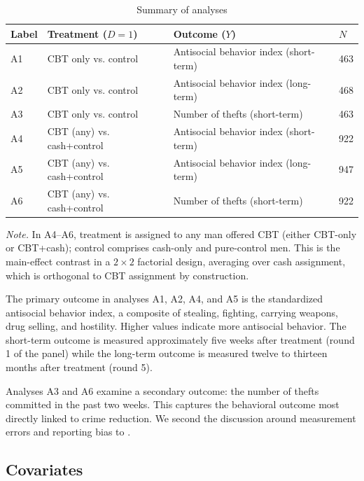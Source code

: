 \documentclass[11pt]{article}
\begin{document}
\begin{table}[H]
\centering
\caption{Summary of analyses}
\label{tab:analyses}
\begin{tabular}{llll}
\toprule
Label & Treatment ($D=1$) & Outcome ($Y$) & $N$ \\
\midrule
A1 & CBT only vs. control & Antisocial behavior index (short-term) & 463 \\
A2 & CBT only vs. control & Antisocial behavior index (long-term)  & 468 \\
A3 & CBT only vs. control & Number of thefts (short-term)           & 463 \\
\midrule
A4 & CBT (any) vs. cash+control & Antisocial behavior index (short-term) &  922 \\
A5 & CBT (any) vs. cash+control & Antisocial behavior index (long-term)  & 947 \\
A6 & CBT (any) vs. cash+control & Number of thefts (short-term)           & 922 \\
\bottomrule
\end{tabular}
\begin{minipage}
{\textwidth}
\footnotesize \noindent\textit{Note.} In A4--A6, treatment is assigned to any man offered CBT (either CBT-only or CBT+cash); control comprises cash-only and pure-control men. This is the main-effect contrast in a $2\times 2$ factorial design, averaging over cash assignment, which is orthogonal to CBT assignment by construction.
\end{minipage}
\end{table}



The primary outcome in analyses A1, A2, A4, and A5 is the standardized antisocial behavior
index, a composite of stealing, fighting,
carrying weapons, drug selling, and hostility. Higher values indicate more
antisocial behavior. The short-term outcome is measured approximately five
weeks after treatment (round 1 of the panel) while the long-term outcome is
measured twelve to thirteen months after treatment (round 5).

Analyses A3 and A6 examine a secondary outcome: the number of thefts committed
in the past two weeks. This captures the behavioral outcome most directly
linked to crime reduction. We second the discussion around measurement errors and reporting bias to \cite{blattman2017}.

\subsection{Covariates}
\end{document}
